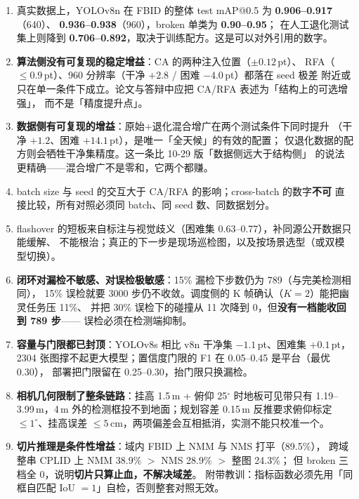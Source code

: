 \documentclass[UTF8,a4paper,11pt]{ctexart}
\begin{document}
\begin{enumerate}[label=(\arabic*)]
  \item 真实数据上，YOLOv8n 在 FBID 的整体 test mAP@0.5 为 \textbf{0.906--0.917}（640）、
        \textbf{0.936--0.938}（960），broken 单类为 \textbf{0.90--0.95}；
        在人工退化测试集上则降到 \textbf{0.706--0.892}，取决于训练配方。这是可以对外引用的数字。
  \item \textbf{算法侧没有可复现的稳定增益}：CA 的两种注入位置（$\pm0.12$\,pt）、
        RFA（$\le0.9$\,pt）、960 分辨率（干净 $+2.8$ / 困难 $-4.0$\,pt）都落在 seed 极差
        附近或只在单一条件下成立。论文与答辩中应把 CA/RFA 表述为「结构上的可选增强」，
        而不是「精度提升点」。
  \item \textbf{数据侧有可复现的增益}：原始+退化混合增广在两个测试条件下同时提升
        （干净 $+1.2$、困难 $+14.1$\,pt），是唯一「全天候」的有效的配置；
        仅退化数据的配方则会牺牲干净集精度。这一条比 10-29 版「数据侧远大于结构侧」
        的说法更精确——混合增广不是零和，它两个都赚。
  \item batch size 与 seed 的交互大于 CA/RFA 的影响；cross-batch 的数字\textbf{不可}
        直接比较，所有对照必须同 batch、同 seed 数、同数据划分。
  \item flashover 的短板来自标注与视觉歧义（困难集 0.63--0.77），补同源公开数据只能缓解、
        不能根治；真正的下一步是现场巡检图，以及按场景选型（或双模型切换）。
  \item \textbf{闭环对漏检不敏感、对误检极敏感}：15\% 漏检下步数仍为 789（与完美检测相同），
        15\% 误检就要 3000 步仍不收敛。调度侧的 K 帧确认（$K=2$）能把幽灵任务压 11\%、
        并把 30\% 误检下的碰撞从 11 次降到 0，但{\bf 没有一档能收回到 789 步}——
        误检必须在检测端抑制。
  \item \textbf{容量与门限都已封顶}：YOLOv8s 相比 v8n 干净集 $-1.1$\,pt、困难集 $+0.1$\,pt，
        2304 张图撑不起更大模型；置信度门限的 F1 在 0.05--0.45 是平台（最优 0.30），
        部署把门限留在 0.25--0.30，抬门限只换漏检。
  \item \textbf{相机几何限制了整条链路}：挂高 1.5\,m + 俯仰 25$^\circ$ 时地板可见带只有
        1.19--3.99\,m，4\,m 外的检测框投不到地面；规划容差 0.15\,m 反推要求俯仰标定
        $\le1^\circ$、挂高误差 $\le5$\,cm，两项偏差会互相抵消，实测不能只校准一个。
  \item \textbf{切片推理是条件性增益}：域内 FBID 上 NMM 与 NMS 打平（89.5\%），
        跨域整串 CPLID 上 NMM 38.9\% $>$ NMS 28.9\% $>$ 整图 24.3\%；
        但 broken 三档全 0，说明\textbf{切片只算止血，不解决域差}。
        附带教训：指标函数必须先用「同框自匹配 IoU $=1$」自检，否则整套对照无效。
\end{enumerate}
\end{document}
